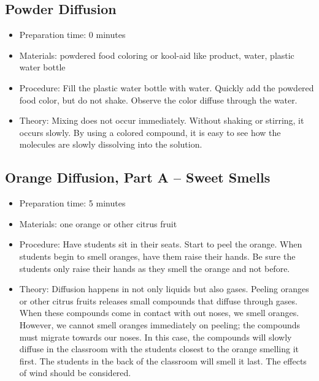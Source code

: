 \subsection{Powder Diffusion}
\begin{itemize}
\item{Preparation time: 0 minutes}
\item{Materials: powdered food coloring or kool-aid like product, water, plastic water bottle}
\item{Procedure: Fill the plastic water bottle with water. Quickly add the powdered food color, but do not shake. Observe the color diffuse through the water.}
\item{Theory: Mixing does not occur immediately. Without shaking or stirring, it occurs slowly. By using a colored compound, it is easy to see how the molecules are slowly dissolving into the solution.}
\end{itemize}

\subsection{Orange Diffusion, Part A -- Sweet Smells}
\begin{itemize}
\item{Preparation time: 5 minutes}
\item{Materials: one orange or other citrus fruit}
\item{Procedure: Have students sit in their seats. Start to peel the orange. When students begin to smell oranges, have them raise their hands. Be sure the students only raise their hands as they smell the orange and not before.}
\item{Theory: Diffusion happens in not only liquids but also gases. Peeling oranges or other citrus fruits releases small compounds that diffuse through gases. When these compounds come in contact with out noses, we smell oranges. However, we cannot smell oranges immediately on peeling; the compounds must migrate towards our noses. In this case, the compounds will slowly diffuse in the classroom with the students closest to the orange smelling it first. The students in the back of the classroom will smell it last. The effects of wind should be considered.}
\end{itemize}

